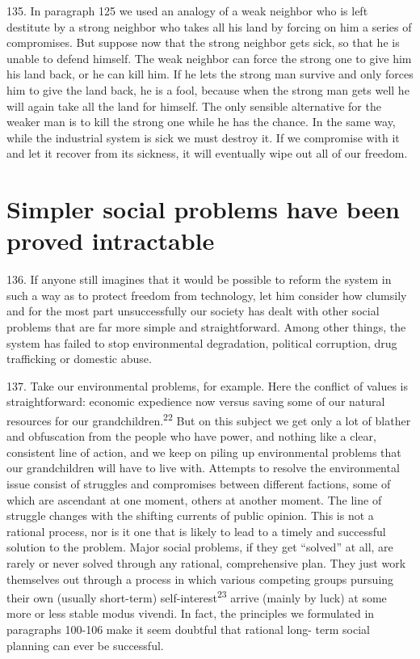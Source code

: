 \documentclass{article}
\begin{document}
135.  In paragraph 125 we used an analogy of a weak neighbor who is left destitute by a strong 
neighbor who takes all his land by forcing on him a series of compromises.  But suppose now that 
the strong neighbor gets sick, so that he is unable to defend himself.  The weak neighbor can force 
the strong one to give him his land back, or he can kill him.  If he lets the strong man survive and 
only forces him to give the land back, he is a fool, because when the strong man gets well he will 
again take all the land for himself.  The only sensible alternative for the weaker man is to kill the 
strong one while he has the chance.  In the same way, while the industrial system is sick we must 
destroy it.  If we compromise with it and let it recover from its sickness, it will eventually wipe 
out all of our freedom. 


\section{Simpler social problems have been proved intractable}

\hspace{0.5cm} 136.  If anyone still imagines that it would be possible to reform the system in such a way as to 
protect freedom from technology, let him consider how clumsily and for the most part 
unsuccessfully  our  society  has  dealt  with  other  social  problems  that  are  far  more  simple  and
straightforward.   Among  other  things,  the  system  has  failed  to  stop  environmental  degradation,  
political corruption, drug trafficking or domestic abuse. \vspace{\baselineskip}

137.  Take our environmental problems, for example.  Here the conflict of values is 
straightforward:  economic  expedience  now  versus  saving  some  of  our  natural  resources  for  our  
grandchildren.\textsuperscript{22} But on this subject we get only a lot of blather and obfuscation from the people 
who  have  power,  and  nothing  like  a  clear,  consistent  line  of  action,  and  we  keep  on  piling  up  
environmental  problems  that  our  grandchildren  will  have  to  live  with.   Attempts  to  resolve  the  
environmental  issue  consist  of  struggles  and  compromises  between  different  factions,  some  of  
which are ascendant at one moment, others at another moment.  The line of struggle changes with 
the shifting currents of public opinion.  This is not a rational process, nor is it one that is likely to 
lead to a timely and successful solution to the problem.  Major social problems, if they get “solved” 
at  all,  are  rarely  or  never  solved  through  any  rational,  comprehensive  plan.   They  just  work  
themselves out through a process in which various competing groups pursuing their own (usually 
short-term) self-interest\textsuperscript{23} arrive (mainly by luck) at some more or less stable modus vivendi.  In 
fact, the principles we formulated in paragraphs 100-106 make it seem doubtful that rational long-
term social planning can ever be successful. \vspace{\baselineskip}
\end{document}
